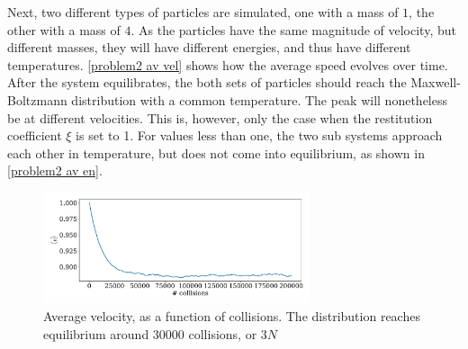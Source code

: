 \documentclass{article}
\begin{document}
    Next, two different types of particles are simulated, one with a mass of $1$, the other with a mass of $4$.
    As the particles have the same magnitude of velocity, but different masses, they will have different energies, and thus have different temperatures.
    \autoref{problem2 av vel} shows how the average speed evolves over time.
    After the system equilibrates, the both sets of particles should reach the Maxwell-Boltzmann distribution with a common temperature.
    The peak will nonetheless be at different velocities.
    This is, however, only the case when the restitution coefficient $\xi$ is set to 1.
    For values less than one, the two sub systems approach each other in temperature, but does not come into equilibrium, as shown in \autoref{problem2 av en}.

    \begin{figure}[H]
        \centering
        \includegraphics[width=0.7\textwidth]{../plots/problem1/v_av.pdf}
        \caption{Average velocity, as a function of collisions.
        The distribution reaches equilibrium around $30000$ collisions, or $3N$}
        \label{problem1 av vel}
    \end{figure}
    
\end{document}
